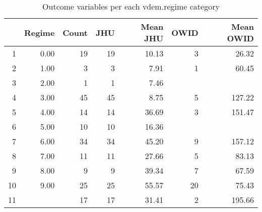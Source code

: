 \begin{table}[ht]
\centering
\caption{Outcome variables per each vdem.regime category} 
\begingroup\footnotesize
\begin{tabular}{rrrrrrr}
  \hline
 & Regime & Count & JHU & Mean JHU & OWID & Mean OWID \\ 
  \hline
1 & 0.00 &  19 &  19 & 10.13 &   3 & 26.32 \\ 
  2 & 1.00 &   3 &   3 & 7.91 &   1 & 60.45 \\ 
  3 & 2.00 &   1 &   1 & 7.46 &  &  \\ 
  4 & 3.00 &  45 &  45 & 8.75 &   5 & 127.22 \\ 
  5 & 4.00 &  14 &  14 & 36.69 &   3 & 151.47 \\ 
  6 & 5.00 &  10 &  10 & 16.36 &  &  \\ 
  7 & 6.00 &  34 &  34 & 45.20 &   9 & 157.12 \\ 
  8 & 7.00 &  11 &  11 & 27.66 &   5 & 83.13 \\ 
  9 & 8.00 &   9 &   9 & 39.34 &   7 & 67.59 \\ 
  10 & 9.00 &  25 &  25 & 55.57 &  20 & 75.43 \\ 
  11 &  &  17 &  17 & 31.41 &   2 & 195.66 \\ 
   \hline
\end{tabular}
\endgroup
\end{table}

